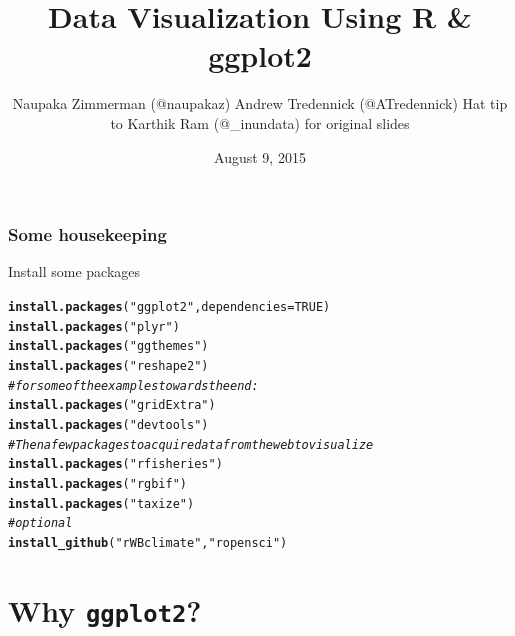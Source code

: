 \documentclass{beamer}\usepackage[]{graphicx}\usepackage[]{color}
\makeatletter
\newcommand{\hlnum}[1]{\textcolor[rgb]{0.686,0.059,0.569}{#1}}%
\newcommand{\hlstr}[1]{\textcolor[rgb]{0.192,0.494,0.8}{#1}}%
\newcommand{\hlcom}[1]{\textcolor[rgb]{0.678,0.584,0.686}{\textit{#1}}}%
\newcommand{\hlstd}[1]{\textcolor[rgb]{0.345,0.345,0.345}{#1}}%
\newcommand{\hlkwc}[1]{\textcolor[rgb]{0.333,0.667,0.333}{#1}}%
\newcommand{\hlkwd}[1]{\textcolor[rgb]{0.737,0.353,0.396}{\textbf{#1}}}%
\newenvironment{kframe}{%
 \def\at@end@of@kframe{}%
 \ifinner\ifhmode%
  \def\at@end@of@kframe{\end{minipage}}%
  \begin{minipage}{\columnwidth}%
 \fi\fi%
 \def\FrameCommand##1{\hskip\@totalleftmargin \hskip-\fboxsep
 \colorbox{shadecolor}{##1}\hskip-\fboxsep
     \hskip-\linewidth \hskip-\@totalleftmargin \hskip\columnwidth}%
 \MakeFramed {\advance\hsize-\width
   \@totalleftmargin\z@ \linewidth\hsize
   \@setminipage}}%
 {\par\unskip\endMakeFramed%
 \at@end@of@kframe}
\newenvironment{knitrout}{}{} %
\makeatother
\begin{document}

\title{Data Visualization Using R \& ggplot2}
\author{Naupaka Zimmerman (@naupakaz) \linebreak Andrew Tredennick (@ATredennick) \linebreak \linebreak Hat tip to Karthik Ram (@\_inundata) for original slides \linebreak}
\date{August 9, 2015}
\maketitle


\begin{frame}[fragile]
\frametitle{Some housekeeping}
Install some packages
\begin{knitrout}\footnotesize
{}\color{fgcolor}\begin{kframe}
\begin{alltt}
\hlkwd{install.packages}\hlstd{(}\hlstr{"ggplot2"}\hlstd{,} \hlkwc{dependencies} \hlstd{=} \hlnum{TRUE}\hlstd{)}
\hlkwd{install.packages}\hlstd{(}\hlstr{"plyr"}\hlstd{)}
\hlkwd{install.packages}\hlstd{(}\hlstr{"ggthemes"}\hlstd{)}
\hlkwd{install.packages}\hlstd{(}\hlstr{"reshape2"}\hlstd{)}
\hlcom{# for some of the examples towards the end:}
\hlkwd{install.packages}\hlstd{(}\hlstr{"gridExtra"}\hlstd{)}
\hlkwd{install.packages}\hlstd{(}\hlstr{"devtools"}\hlstd{)}
\hlcom{# Then a few packages to acquire data from the web to visualize}
\hlkwd{install.packages}\hlstd{(}\hlstr{"rfisheries"}\hlstd{)}
\hlkwd{install.packages}\hlstd{(}\hlstr{"rgbif"}\hlstd{)}
\hlkwd{install.packages}\hlstd{(}\hlstr{"taxize"}\hlstd{)}
\hlcom{# optional}
\hlkwd{install_github}\hlstd{(}\hlstr{"rWBclimate"}\hlstd{,} \hlstr{"ropensci"}\hlstd{)}
\end{alltt}
\end{kframe}
\end{knitrout}
\end{frame}


\section*{Why \texttt{ggplot2}?}
\frame{\sectionpage}
\end{document}
